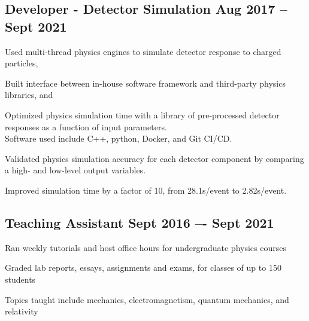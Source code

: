 \documentclass[letter,10pt]{article}
\begin{document}
\subsection{{Developer - Detector Simulation  \hfill Aug 2017 -- Sept 2021 }}
\begin{zitemize}
\item Used multi-thread physics engines to simulate detector response to charged particles,
\item Built interface between in-house software framework and third-party physics libraries, and
\item Optimized physics simulation time with a library of pre-processed detector responses as a function of input parameters. \\
Software used include C++, python, Docker, and Git CI/CD.
\item Validated physics simulation accuracy for each detector component by comparing a high- and low-level output variables.
\item Improved simulation time by a factor of 10, from 28.1s/event to 2.82s/event. 
\end{zitemize}


\subsection{{Teaching Assistant  \hfill Sept 2016 –- Sept 2021}}
\begin{zitemize}
\item Ran weekly tutorials and host office hours for undergraduate physics courses
\item Graded lab reports, essays, assignments and exams, for classes of up to 150 students
\item Topics taught include mechanics, electromagnetism, quantum mechanics, and relativity
\end{zitemize}
\end{document}
